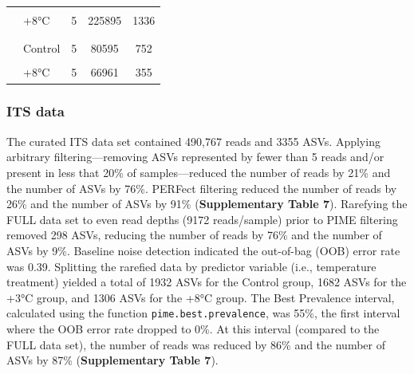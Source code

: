 \documentclass[
  10pt,
  letterpaper,
  DIV=11,
  numbers=noendperiod]{scrartcl}
\begin{document}
\begin{table}[H]
\begin{tabular}[t]{llccc}
\hspace{1em}\cellcolor{gray!6}{} & \cellcolor{gray!6}{+3°C} & \cellcolor{gray!6}{5} & \cellcolor{gray!6}{262133} & \cellcolor{gray!6}{1339}\\
\hspace{1em} & +8°C & 5 & 225895 & 1336\\
\addlinespace[-0.3em]
\multicolumn{5}{l}{\textbf{}}\\
\hspace{1em}\cellcolor{gray!6}{PIME filter} & \cellcolor{gray!6}{} & \cellcolor{gray!6}{15} & \cellcolor{gray!6}{232532} & \cellcolor{gray!6}{1058}\\
\hspace{1em} & Control & 5 & 80595 & 752\\
\hspace{1em}\cellcolor{gray!6}{} & \cellcolor{gray!6}{+3°C} & \cellcolor{gray!6}{5} & \cellcolor{gray!6}{84976} & \cellcolor{gray!6}{692}\\
\hspace{1em} & +8°C & 5 & 66961 & 355\\
\bottomrule
\end{tabular}
\end{table}

\hypertarget{its-data-1}{%
\subsubsection{ITS data}\label{its-data-1}}

The curated ITS data set contained 490,767 reads and 3355 ASVs. Applying
arbitrary filtering---removing ASVs represented by fewer than 5 reads
and/or present in less that 20\% of samples---reduced the number of
reads by 21\% and the number of ASVs by 76\%. PERFect filtering reduced
the number of reads by 26\% and the number of ASVs by 91\%
(\textbf{Supplementary Table 7}). Rarefying the FULL data set to even
read depths (9172 reads/sample) prior to PIME filtering removed 298
ASVs, reducing the number of reads by 76\% and the number of ASVs by
9\%. Baseline noise detection indicated the out-of-bag (OOB) error rate
was 0.39. Splitting the rarefied data by predictor variable (i.e.,
temperature treatment) yielded a total of 1932 ASVs for the Control
group, 1682 ASVs for the +3°C group, and 1306 ASVs for the +8°C group.
The Best Prevalence interval, calculated using the function
\texttt{pime.best.prevalence}, was 55\%, the first interval where the
OOB error rate dropped to 0\%. At this interval (compared to the FULL
data set), the number of reads was reduced by 86\% and the number of
ASVs by 87\% (\textbf{Supplementary Table 7}).
\end{document}
